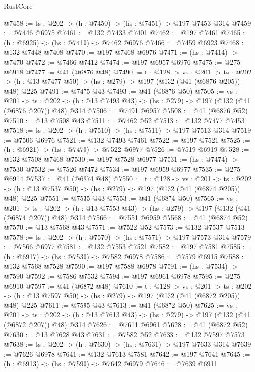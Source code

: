 \begin{lexlean}{RustCore}
\begin{coremodule}
@7458 := {ts : @202} -> (h : @7450) -> (hs : @7451) -> @197 @7453 @314
@7459 := @7446 @6975
@7461 := @132 @7433 @7401
@7462 := @197 @7461
@7465 := (h : @6925) -> (hs : @7410) -> @7462 @6976
@7466 := @7459 @6923
@7468 := @132 @7448 @7408
@7470 := @197 @7468 @6976
@7471 := (hs : @7414) -> @7470
@7472 := @7466 @7412
@7474 := @197 @6957 @6976
@7475 := @275 @6918
@7477 := @41 (@6876 @48)
@7490 := {t : @128} ->
  {vs : @201} ->
  {ts : @202} -> (h : @13 @7477 @50) -> (hs : @279) -> @197 (@132 (@41 (@6876 @205)) @48) @225
@7491 := @7475 @43
@7493 := @41 (@6876 @50)
@7505 := {vs : @201} ->
  {ts : @202} -> (h : @13 @7493 @43) -> (hs : @279) -> @197 (@132 (@41 (@6876 @207)) @48) @314
@7506 := @7491 @6957
@7508 := @41 (@6876 @52)
@7510 := @13 @7508 @43
@7511 := @7462 @52
@7513 := @132 @7477 @7453
@7518 := {ts : @202} -> (h : @7510) -> (hs : @7511) -> @197 @7513 @314
@7519 := @7506 @6976
@7521 := @132 @7493 @7461
@7522 := @197 @7521
@7525 := (h : @6921) -> (hs : @7470) -> @7522 @6977
@7526 := @7519 @6919
@7528 := @132 @7508 @7468
@7530 := @197 @7528 @6977
@7531 := (hs : @7474) -> @7530
@7532 := @7526 @7472
@7534 := @197 @6959 @6977
@7535 := @275 @6914
@7537 := @41 (@6874 @48)
@7550 := {t : @128} ->
  {vs : @201} ->
  {ts : @202} -> (h : @13 @7537 @50) -> (hs : @279) -> @197 (@132 (@41 (@6874 @205)) @48) @225
@7551 := @7535 @43
@7553 := @41 (@6874 @50)
@7565 := {vs : @201} ->
  {ts : @202} -> (h : @13 @7553 @43) -> (hs : @279) -> @197 (@132 (@41 (@6874 @207)) @48) @314
@7566 := @7551 @6959
@7568 := @41 (@6874 @52)
@7570 := @13 @7568 @43
@7571 := @7522 @52
@7573 := @132 @7537 @7513
@7578 := {ts : @202} -> (h : @7570) -> (hs : @7571) -> @197 @7573 @314
@7579 := @7566 @6977
@7581 := @132 @7553 @7521
@7582 := @197 @7581
@7585 := (h : @6917) -> (hs : @7530) -> @7582 @6978
@7586 := @7579 @6915
@7588 := @132 @7568 @7528
@7590 := @197 @7588 @6978
@7591 := (hs : @7534) -> @7590
@7592 := @7586 @7532
@7594 := @197 @6961 @6978
@7595 := @275 @6910
@7597 := @41 (@6872 @48)
@7610 := {t : @128} ->
  {vs : @201} ->
  {ts : @202} -> (h : @13 @7597 @50) -> (hs : @279) -> @197 (@132 (@41 (@6872 @205)) @48) @225
@7611 := @7595 @43
@7613 := @41 (@6872 @50)
@7625 := {vs : @201} ->
  {ts : @202} -> (h : @13 @7613 @43) -> (hs : @279) -> @197 (@132 (@41 (@6872 @207)) @48) @314
@7626 := @7611 @6961
@7628 := @41 (@6872 @52)
@7630 := @13 @7628 @43
@7631 := @7582 @52
@7633 := @132 @7597 @7573
@7638 := {ts : @202} -> (h : @7630) -> (hs : @7631) -> @197 @7633 @314
@7639 := @7626 @6978
@7641 := @132 @7613 @7581
@7642 := @197 @7641
@7645 := (h : @6913) -> (hs : @7590) -> @7642 @6979
@7646 := @7639 @6911

\end{coremodule}
\end{lexlean}
